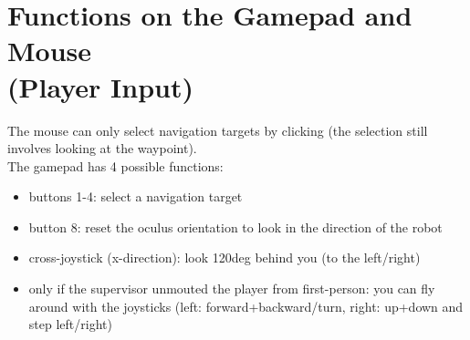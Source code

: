 \documentclass[a4paper, 12pt]{article}
\begin{document}
\section{Functions on the Gamepad and Mouse\\(Player Input)}
The mouse can only select navigation targets by clicking (the selection still involves looking at the waypoint).\\
The gamepad has 4 possible functions:
\begin{itemize}
\item buttons 1-4: select a navigation target
\item button 8: reset the oculus orientation to look in the direction of the robot
\item cross-joystick (x-direction): look 120deg behind you (to the left/right)
\item only if the supervisor unmouted the player from first-person: you can fly around with the joysticks (left: forward+backward/turn, right: up+down and step left/right)
\end{itemize}
\end{document}
